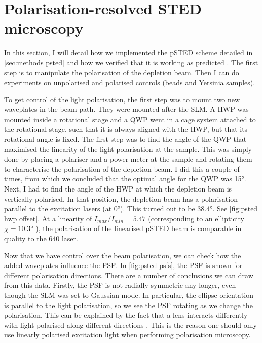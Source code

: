 \section{Polarisation-resolved STED microscopy}

In this section, I will detail how we implemented the pSTED scheme detailed in \autoref{sec:methods psted} and how we verified that it is working as predicted . The first step is to manipulate the polarisation of the depletion beam. Then I can do experiments on unpolarised and polarised controls (beads and Yersinia samples).

To get control of the light polarisation, the first step was to mount two new waveplates in the beam path. They were mounted after the SLM. A HWP was mounted inside a rotational stage and a QWP went in a cage system attached to the rotational stage, such that it is always aligned with the HWP, but that its rotational angle is fixed. The first step was to find the angle of the QWP that maximised the linearity of the light polarisation at the sample. This was simply done by placing a polariser and a power meter at the sample and rotating them to characterise the polarisation of the depletion beam. I did this a couple of times, from which we concluded that the optimal angle for the QWP was 15°. Next, I had to find the angle of the HWP at which the depletion beam is vertically polarised. In that position, the depletion beam has a polarisation parallel to the excitation lasers (at 0°). This turned out to be 38.4°. See \autoref{fig:psted hwp offset}. At a linearity of $ I_{max}/I_{min} = 5.47 $ (corresponding to an ellipticity $ \chi = \ang{10.3} $ ), the polarisation of the linearised pSTED beam is comparable in quality to the 640 laser.

Now that we have control over the beam polarisation, we can check how the added waveplates influence the PSF. In \autoref{fig:psted psfs}, the PSF is shown for different polarisation directions. There are a number of conclusions we can draw from this data.  Firstly, the PSF is not radially symmetric any longer, even though the SLM was set to Gaussian mode. In particular, the ellipse orientation is parallel to the light polarisation, so we see the PSF rotating as we change the polarisation. This can be explained by the fact that a lens interacts differently with light polarised along different directions \cite{Egner2020}. This is the reason one should only use linearly polarised excitation light when performing polarisation microscopy.

